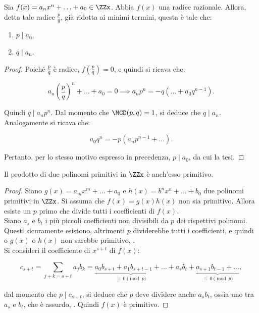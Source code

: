 \begin{theorem}
    \label{th:radici_razionali}
    Sia $f(x) = a_n x^n + \ldots + a_0 \in \ZZx$. Abbia $f(x)$
    una radice razionale. Allora, detta tale radice $\frac{p}{q}$,  già ridotta ai minimi termini, questa è tale che:

    \begin{enumerate}[ (i.)]
        \item $p \mid a_0$,
        \item $q \mid a_n$.
    \end{enumerate}
\end{theorem}

\begin{proof}
    Poiché $\frac{p}{q}$ è radice, $f\left(\frac{p}{q}\right)=0$, e
    quindi si ricava che:

    \[ a_n \left( \frac{p}{q} \right)^n + \ldots + a_0 = 0 \implies
        a_n p^n = -q( \ldots + a_0 q^{n-1}). \]

    \vskip 0.1in

    Quindi $q \mid a_n p^n$. Dal momento che $\MCD(p, q)=1$, si
    deduce che $q \mid a_n$. \\

    Analogamente si ricava che:

    \[ a_0 q^n = -p(a_n p^{n-1} + \ldots). \]

    \vskip 0.1in

    Pertanto, per lo stesso motivo espresso in precedenza,
    $p \mid a_0$, da cui la tesi.
\end{proof}

\begin{theorem}
    \label{th:lemma_gauss}
    Il prodotto di due polinomi primitivi in $\ZZx$ è anch'esso primitivo.
\end{theorem}

\begin{proof}
    Siano $g(x) = a_m x^m + \ldots + a_0$ e $h(x) = b^n x^n + \ldots + b_0$ due polinomi primitivi in $\ZZx$. Si assuma che $f(x)=g(x)h(x)$
    non sia primitivo. Allora esiste un $p$ primo che divide tutti i
    coefficienti di $f(x)$. \\

    Siano $a_s$ e $b_t$ i più piccoli coefficienti non divisibili
    da $p$ dei rispettivi polinomi. Questi sicuramente esistono,
    altrimenti $p$ dividerebbe tutti i coefficienti, e quindi
    o $g(x)$ o $h(x)$ non sarebbe primitivo, \Lightning{}. \\

    Si consideri il coefficiente di $x^{s+t}$ di $f(x)$:

    \[c_{s+t} = \sum_{j+k=s+t} a_j b_k = \underbrace{a_0 b_{s+t} + a_1 b_{s+t-1} + \ldots}_{\equiv \, 0 \pmod p} + a_s b_t + \underbrace{a_{s+1}b_{t-1} + \ldots}_{\equiv \, 0 \pmod p},\]

    dal momento che $p \mid c_{s+t}$, si deduce che $p$ deve dividere
    anche $a_sb_t$, ossia uno tra $a_s$ e $b_t$, che è assurdo, \Lightning{}. Quindi $f(x)$ è primitivo.

\end{proof}

